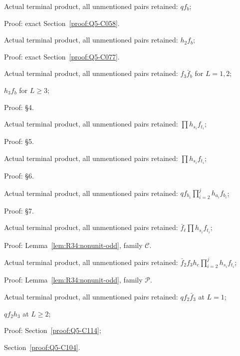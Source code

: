 \begin{description}[style=nextline,leftmargin=1.6em]
\item[{even, \((1,\allowbreak  b)\)}] Actual terminal product, all unmentioned pairs retained: \(qf_b\);\par\noindent Proof: exact Section~\ref{proof:Q5-C058}.
\item[{even, \((2,\allowbreak  b)\)}] Actual terminal product, all unmentioned pairs retained: \(h_2f_b\);\par\noindent Proof: exact Section~\ref{proof:Q5-C077}.
\item[{even, \((3,\allowbreak  b),\allowbreak  b\ge4\)}] Actual terminal product, all unmentioned pairs retained: \(f_3\bar f_b\) for \(L=1,\allowbreak  2\);\par\noindent \(h_3f_b\) for \(L\ge3\);\par\noindent Proof: §4.
\item[{even, \(s_1<t_1<\cdots<s_j<t_j\), \(s_1\ge4\)}] Actual terminal product, all unmentioned pairs retained: \(\prod h_{s_i}f_{t_i}\);\par\noindent Proof: §5.
\item[{even, \(j\ge2,\allowbreak  s_1=2\) or \(3\)}] Actual terminal product, all unmentioned pairs retained: \(\prod h_{s_i}f_{t_i}\);\par\noindent Proof: §6.
\item[{even, \(1<b_1<a_2<b_2<\cdots<a_j<b_j\), \(j\ge2\)}] Actual terminal product, all unmentioned pairs retained: \(qf_{b_1}\prod_{i=2}^j h_{a_i}f_{b_i}\);\par\noindent Proof: §7.
\item[{odd, \(2\le\ell<s_1<t_1<\cdots<s_j<t_j\), \(s_1\ge4\)}] Actual terminal product, all unmentioned pairs retained: \(\bar f_\ell\prod h_{s_i}f_{t_i}\);\par\noindent Proof: Lemma~\ref{lem:R34:nonunit-odd}, family \(\mathcal C\).
\item[{odd, \((2,\allowbreak  3,\allowbreak  c,\allowbreak  s_2,\allowbreak  t_2,\allowbreak  \ldots)\)}] Actual terminal product, all unmentioned pairs retained: \(\bar f_2f_3h_c\prod_{i=2}^j h_{s_i}f_{t_i}\);\par\noindent Proof: Lemma~\ref{lem:R34:nonunit-odd}, family \(\mathcal P\).
\item[{odd, \((1,\allowbreak  2,\allowbreak  3)\)}] Actual terminal product, all unmentioned pairs retained: \(qf_2\bar f_3\) at \(L=1\);\par\noindent \(qf_2h_3\) at \(L\ge2\);\par\noindent Proof: Section~\ref{proof:Q5-C114};\par\noindent Section~\ref{proof:Q5-C104}.

\end{description}
